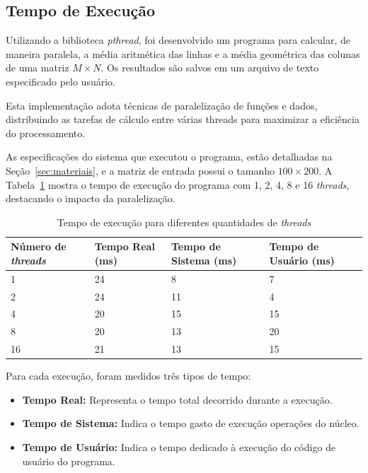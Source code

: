 \documentclass[
	12pt,				%
	oneside,   	        %
	a4paper,			%
	english,			%
	french,				%
	spanish,			%
	brazil,				%
	]{pacotes/abntex2}
\begin{document}
\subsection{Tempo de Execução}
\label{subsec:time}

Utilizando a biblioteca \textit{pthread}, foi desenvolvido um programa para calcular, de maneira paralela, a média aritmética das linhas e a média geométrica das colunas de uma matriz $M \times N$. Os resultados são salvos em um arquivo de texto especificado pelo usuário.

Esta implementação adota técnicas de paralelização de funções e dados, distribuindo as tarefas de cálculo entre várias threads para maximizar a eficiência do processamento.

As especificações do sistema que executou o programa, estão detalhadas na Seção~\ref{sec:materiais}, e a matriz de entrada possui o tamanho $100 \times 200$. A Tabela~\ref{table:time} mostra o tempo de execução do programa com 1, 2, 4, 8 e 16 \textit{threads}, destacando o impacto da paralelização.

\begin{table}[!htb]
\centering
\caption{Tempo de execução para diferentes quantidades de \textit{threads}}
\label{table:time}
\footnotesize
\begin{tabular}{@{}l|lll@{}}
\toprule
\textbf{Número de \textit{threads}} & \textbf{Tempo Real (ms)} & \textbf{Tempo de Sistema (ms)} & \textbf{Tempo de Usuário (ms)}\\ 
\midrule
1 & 24 & 8 & 7 \\
2 & 24 & 11 & 4 \\
4 & 20 & 15 & 15 \\
8 & 20 & 13 & 20 \\
16 & 21 & 13 & 15 \\
\bottomrule
\end{tabular}
\end{table}

Para cada execução, foram medidos três tipos de tempo:

\begin{itemize}
    \item \textbf{Tempo Real:} Representa o tempo total decorrido durante a execução.
    \item \textbf{Tempo de Sistema:} Indica o tempo gasto de execução operações do núcleo.
    \item \textbf{Tempo de Usuário:} Indica o tempo dedicado à execução do código de usuário do programa.
\end{itemize}
\end{document}
